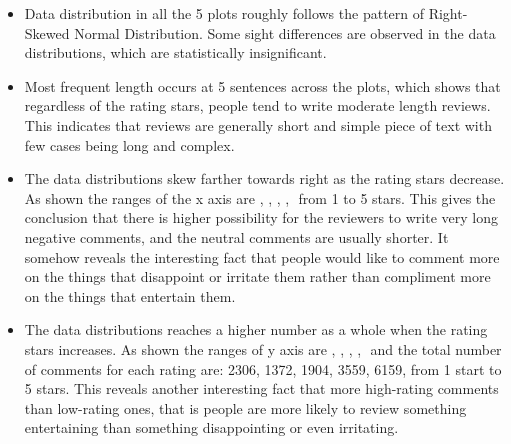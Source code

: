 \documentclass[sigconf]{acmart}
\begin{document}
\begin{itemize}
\item Data distribution in all the 5 plots roughly follows the pattern of Right-Skewed Normal Distribution. Some sight differences are observed in the data distributions, which are statistically insignificant.
\item Most frequent length occurs at 5 sentences across the plots, which shows that regardless of the rating stars, people tend to write moderate length reviews. This indicates that reviews are generally short and simple piece of text with few cases being long and complex.
\item The data distributions skew farther towards right as the rating stars decrease. As shown the ranges of the x axis are \begin{math}[1,85]\end{math}, \begin{math}[1,74]\end{math}, \begin{math}[1,55]\end{math}, \begin{math}[1,71]\end{math}, \begin{math}[1,60]\end{math} from 1 to 5 stars. This gives the conclusion that there is higher possibility for the reviewers to write very long negative comments, and the neutral comments are usually shorter. It somehow reveals the interesting fact that people would like to comment more on the things that disappoint or irritate them rather than compliment more on the things that entertain them.
\item The data distributions reaches a higher number as a whole when the rating stars increases. As shown the ranges of y axis are \begin{math}[0,219]\end{math}, \begin{math}[0,124]\end{math}, \begin{math}[0,191]\end{math}, \begin{math}[0,389]\end{math}, \begin{math}[0,929]\end{math} and the total number of comments for each rating are: 2306, 1372, 1904, 3559, 6159, from 1 start to 5 stars. This reveals another interesting fact that more high-rating comments than low-rating ones, that is people are more likely to review something entertaining than something disappointing or even irritating.
\end{itemize}
\end{document}
